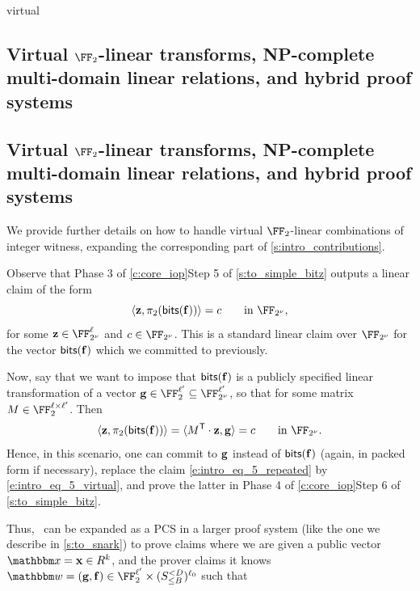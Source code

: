 \begin{lncsappendix}{virtual}
\iflncs\subsection{Virtual $\FF_2$-linear transforms, NP-complete multi-domain linear relations, and hybrid proof systems}\label{s:to_f2_virtual}\else\subsection{Virtual $\FF_2$-linear transforms, NP-complete multi-domain linear relations, and hybrid proof systems}\label{s:to_f2_virtual}\fi

\iflncs We provide further details on how to handle virtual $\FF_2$-linear combinations of integer witness, expanding the corresponding part of \cref{s:intro_contributions}. \else\fi


Observe that \iflncs Phase 3 of \cref{c:core_iop}\else Step 5 of \cref{s:to_simple_bitz}\fi{} outputs a linear claim of the form\iflncs\else\fi
\begin{equation}\label{e:intro_eq_5_repeated} \langle \zz, \pi_2(\bitstext(\bff)) \rangle = c \qquad \text{in  } \comfield,
\end{equation} 
for some $\zz\in \comfield^{\codedim}$ and $c\in \comfield$. This is a standard linear claim over $\comfield$ for the vector $\mathsf{bits}(\mathbf{f})$ which we committed to previously. 


Now, say that we want to impose that $\mathsf{bits}(\mathbf{f})$ is a publicly specified linear transformation of a vector $\bfg\in  \FF_2^{\codedim'} \subseteq  \comfield^{\codedim'}$, so that
%
for some matrix $M\in \FF_2^{\codedim\times \codedim'}$.
Then 
%
\begin{equation}\label{e:intro_eq_5_virtual}
 \langle \zz, \pi_2(\bitstext(\bff)) \rangle  =  \langle M^{\mathsf{T}}\cdot \zz, \bfg \rangle = c \qquad \text{in  } \comfield.
\end{equation}
Hence, in this scenario, one can commit to $\mathbf{g}$ instead of $\mathsf{bits}(\mathbf{f})$ (again, in packed form if necessary),  replace the claim \eqref{e:intro_eq_5_repeated} by \eqref{e:intro_eq_5_virtual}, and prove the latter in \iflncs Phase 4 of \cref{c:core_iop}\else Step 6 of \cref{s:to_simple_bitz}\fi. 



Thus, \ftwoz\ can be expanded as a PCS in a larger proof system (like the one we describe in \cref{s:to_snark}) to prove claims where we are given a public vector $\inp=\xx\in R^\inplen$, and the prover claims  it knows $\wit=(\bfg,\bff)\in \FF_2^{\codedim'}\times (S_{\leq B}^{<D})^{\codedim_0}$ such that 


\end{lncsappendix}
